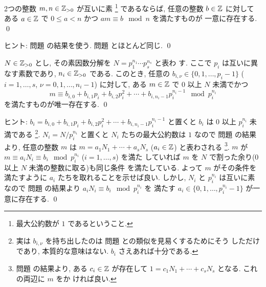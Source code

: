 \documentclass[12pt,twoside]{jarticle}
\begin{document}

\begin{question}
\label{q:U(Z/mZ)} 
  2つの整数 $m,n\in{\mathbb Z}_{>0}$ が互いに素%
  \footnote{最大公約数が $1$ であるということ.}
  であるならば, 任意の整数 $b\in{\mathbb Z}$ に対して
  ある $a\in{\mathbb Z}$ で $0\le a<n$ かつ $am\equiv b\mod{n}$ を満たすものが
  一意に存在する.
  \qed
\end{question}

\noindent
ヒント: 問題  の結果を使う. 
問題  とほとんど同じ.
\qed

\begin{question}
\label{q:Lagrange-interpolation-4-Z}
  $N\in {\mathbb Z}_{>0}$ とし, その素因数分解を $N=p_1^{n_1}\cdots p_s^{n_s}$ と表わ
  す.  ここで $p_i$ は互いに異なす素数であり, $n_i\in{\mathbb Z}_{>0}$ である.
  このとき, 任意の $b_{i,\nu}\in\{0,1,\dots,p_i-1\}$ 
  ($i=1,\dots,s$, $\nu=0,1,\dots,n_i-1$) に対して,
  ある $m\in{\mathbb Z}$ で $0$ 以上 $N$ 未満でかつ
  \begin{equation*}
    m \equiv 
    b_{i,0} + b_{i,1} p_i + b_{i,2} p_i^2 + \cdots + b_{i,n_i-1} p_i^{n_i-1}
    \mod{p_i^{n_i}}
  \end{equation*}
  を満たすものが唯一存在する. \qed
\end{question}

\noindent
ヒント: $b_i=b_{i,0} + b_{i,1} p_i + b_{i,2} p_i^2 + \cdots + b_{i,n_i-1}
p_i^{n_i-1}$ と置くと $b_i$ は $0$ 以上 $p_i^{n_i}$ 未満である%
\footnote{実は $b_{i,\nu}$ を持ち出したのは
  問題  との類似を見易くするためにそう
  しただけであり, 本質的な意味はない. $b_i$ さえあれば十分である.}.  %
$N_i=N/p_i^{n_i}$ と置くと $N_i$ たちの最大公約数は $1$ なので
問題  の結果より, 
任意の整数 $m$ は $m = a_1 N_1 + \cdots + a_s N_s$ ($a_i \in {\mathbb Z}$) 
と表わされる%
\footnote{問題  の結果より, ある $c_i\in{\mathbb Z}$ 
  が存在して $1 = c_1 N_1 + \cdots + c_s N_s$ となる. これの両辺に $m$ をか
  ければ良い.}.
$m$ が $m \equiv a_i N_i \equiv b_i \mod{p_i^{n_i}}$ ($i=1,\dots,s$) を満た
していれば $m$ を $N$ で割った余り($0$ 以上 $N$ 未満の整数に取る)も同じ条件
を満たしている.   
よって $m$ がその条件を満たすように $a_i$ たちを取れることを示せば良い.
しかし, $N_i$ と $p_i^{n_i}$ は互いに素なので
問題  の結果より $a_iN_i\equiv b_i \mod{p_i^{n_i}}$ を
満たす $a_i\in\{0,1,\dots,p_i^{n_i}-1\}$ が一意に存在する.
\qed

\end{document}
